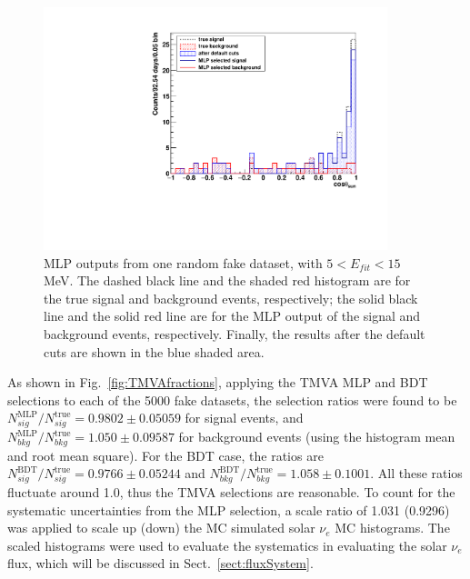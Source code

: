 \begin{figure}[!htb]
	\centering
	\includegraphics[width=10cm]{tmvaHalfFakeData3991_output.pdf}
	\caption[MLP outputs from one random fake dataset ($5<E_{fit}<15$ MeV).]{MLP outputs from one random fake dataset, with $5<E_{fit}<15$ MeV. The dashed black line and the shaded red histogram are for the true signal and background events, respectively; the solid black line and the solid red line are for the MLP output of the signal and background events, respectively. Finally, the results after the default cuts are shown in the blue shaded area.\label{fig:BDToutputs}}
\end{figure}

As shown in Fig.~\ref{fig:TMVAfractions}, applying the TMVA MLP and BDT selections to each of the 5000 fake datasets, the selection ratios were found to be $N^\mathrm{MLP}_{sig}/N^\mathrm{true}_{sig}=0.9802\pm0.05059$ for signal events, and $N^\mathrm{MLP}_{bkg}/N^\mathrm{true}_{bkg}=1.050\pm0.09587$ for background events (using the histogram mean and root mean square). For the BDT case, the ratios are $N^\mathrm{BDT}_{sig}/N^\mathrm{true}_{sig}=0.9766\pm 0.05244$ and $N^\mathrm{BDT}_{bkg}/N^{\mathrm{true}}_{bkg}=1.058\pm 0.1001$. All these ratios fluctuate around 1.0, thus the TMVA selections are reasonable. To count for the systematic uncertainties from the MLP selection, a scale ratio of 1.031 (0.9296) was applied to scale up (down) the MC simulated solar $\nu_e$ MC histograms. The scaled histograms were used to evaluate the systematics in evaluating the solar $\nu_e$ flux, which will be discussed in Sect.~\ref{sect:fluxSystem}.

